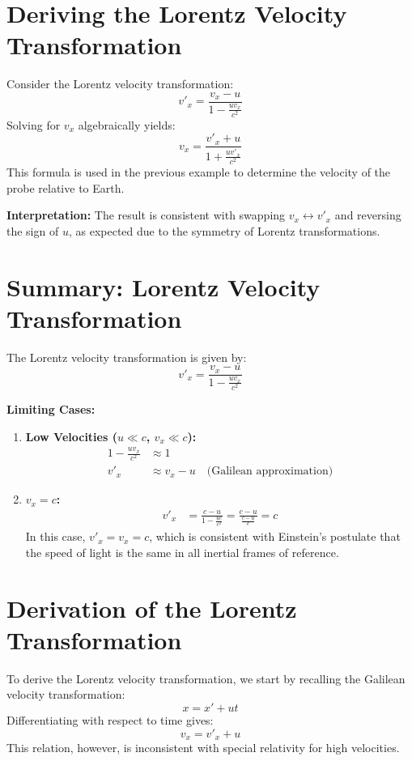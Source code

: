 \documentclass[a4paper,12pt]{article}
\begin{document}
\begin{multicols}{2}
\section*{Deriving the Lorentz Velocity Transformation}
Consider the Lorentz velocity transformation:
\begin{equation}
  v'_x = \frac{v_x - u}{1 - \frac{u v_x}{c^2}}
\end{equation}
Solving for $v_x$ algebraically yields:
\begin{equation}
  v_x = \frac{v'_x + u}{1 + \frac{u v'_x}{c^2}}
\end{equation}
This formula is used in the previous example to determine the velocity of the probe relative to Earth.

\textbf{Interpretation:} The result is consistent with swapping $v_x \leftrightarrow v'_x$ and reversing the sign of $u$, as expected due to the symmetry of Lorentz transformations.

\section*{Summary: Lorentz Velocity Transformation}
The Lorentz velocity transformation is given by:
\begin{equation}
  v'_x = \frac{v_x - u}{1 - \frac{u v_x}{c^2}}
\end{equation}

\textbf{Limiting Cases:}
\begin{enumerate}
  \item \textbf{Low Velocities ($u \ll c$, $v_x \ll c$):}
  \begin{align*}
    1 - \frac{u v_x}{c^2} &\approx 1 \\
    v'_x &\approx v_x - u \quad \text{(Galilean approximation)}
  \end{align*}

  \item \textbf{$v_x = c$:}
  \begin{align*}
    v'_x &= \frac{c - u}{1 - \frac{u c}{c^2}} = \frac{c - u}{\frac{c - u}{c}} = c
  \end{align*}
  In this case, $v'_x = v_x = c$, which is consistent with Einstein's postulate that the speed of light is the same in all inertial frames of reference.
\end{enumerate}

\section*{Derivation of the Lorentz Transformation}
To derive the Lorentz velocity transformation, we start by recalling the Galilean velocity transformation:
\begin{equation}
  x = x' + u t
\end{equation}
Differentiating with respect to time gives:
\begin{equation}
  v_x = v'_x + u
\end{equation}
This relation, however, is inconsistent with special relativity for high velocities.


\end{multicols}
\end{document}
